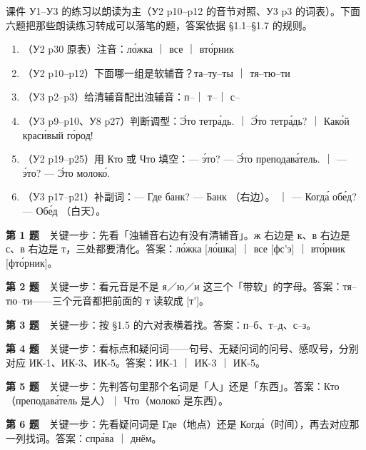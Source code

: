 课件 У1--У3 的练习以朗读为主（У2 p10--p12 的音节对照、У3 p3 的词表）。下面六题把那些朗读练习转成可以落笔的题，答案依据 \S1.1--\S1.7 的规则。

\begin{enumerate}[label=\textbf{第 \arabic* 题}]
\item （У2 p30 原表）注音：ло́жка ｜ все ｜ вто́рник
\item （У2 p10--p12）下面哪一组是软辅音？та–ту–ты ｜ тя–тю–ти
\item （У3 p2--p3）给清辅音配出浊辅音：п–\blank ｜ т–\blank ｜ с–\blank
\item （У3 p9--p10、У8 p27）判断调型：Э́то тетра́дь. ｜ Э́то тетра́дь? ｜ Како́й краси́вый го́род!
\item （У2 p19--p25）用 Кто 或 Что 填空：— \blank э́то? — Э́то преподава́тель. ｜ — \blank э́то? — Э́то молоко́.
\item （У3 p17--p21）补副词：— Где банк? — Банк \blank（右边）。 ｜ — Когда́ обе́д? — Обе́д \blank（白天）。
\end{enumerate}

\textbf{第 1 题}　关键一步：先看「浊辅音右边有没有清辅音」。ж 右边是 к、в 右边是 с、в 右边是 т，三处都要清化。答案：ло́жка [ло́шка] ｜ все [фс’э] ｜ вто́рник [фто́рник]。

\textbf{第 2 题}　关键一步：看元音是不是 я／ю／и 这三个「带软」的字母。答案：тя–тю–ти——三个元音都把前面的 т 读软成 [т']。

\textbf{第 3 题}　关键一步：按 \S1.5 的六对表横着找。答案：п–б、т–д、с–з。

\textbf{第 4 题}　关键一步：看标点和疑问词——句号、无疑问词的问号、感叹号，分别对应 ИК-1、ИК-3、ИК-5。答案：ИК-1 ｜ ИК-3 ｜ ИК-5。

\textbf{第 5 题}　关键一步：先判答句里那个名词是「人」还是「东西」。答案：Кто（преподава́тель 是人）｜ Что（молоко́ 是东西）。

\textbf{第 6 题}　关键一步：先看疑问词是 Где（地点）还是 Когда́（时间），再去对应那一列找词。答案：спра́ва ｜ днём。
